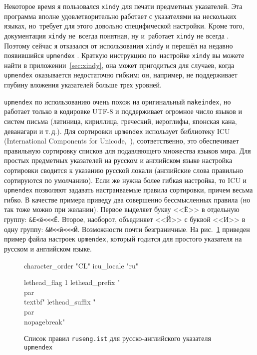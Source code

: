 \documentclass[a4paper,12pt,hyphens]{article}
\newcommand\exe[1]{\texttt{#1}}
\newcommand\file[1]{\texttt{#1}}
\begin{document}
Некоторое время я пользовался \exe{xindy} \parencite{ctan-xindy} для печати предметных указателей. Эта программа
вполне удовлетворительно работает с указателями на нескольких языках, но~требует для этого довольно специфической настройки.
Кроме того, документация \exe{xindy} не~всегда понятная, ну и~работает \exe{xindy} не всегда \parencite{se-xindy}.
Поэтому сейчас я отказался от использования \exe{xindy} и перешёл на недавно появившийся \exe{upmendex} \parencite{ctan-upmendex}. Краткую инструкцию по~настройке \exe{xindy} вы можете найти в приложении~\ref{sec:xindy}, она может пригодиться для случаев, когда \exe{upmendex} оказывается недостаточно гибким: он, например, не поддерживает глубину вложения указателей больше трех уровней.

\exe{upmendex} по использованию очень похож на оригинальный \exe{makeindex}, но работает только в кодировке UTF-8
и поддерживает огромное число языков и систем письма (латиница, кириллица, греческий, иероглифы, японская кана, деванагари и т.\,д.).
Для сортировки \exe{upmendex} использует библиотеку ICU (International Components for Unicode,~\parencite{site-icu}),
соответственно, это обеспечивает правильную сортировку списков для подавляющего множества языков мира. Для простых
предметных указателей на русском и английском языке настройка сортировки сводится к указанию русской локали (английские
слова правильно сортируются по умолчанию). Если же нужна более гибкая настройка, то ICU и \exe{upmendex} позволяют
задавать настраиваемые правила сортировки, причем весьма гибко. В качестве примера приведу два совершенно бессмысленных
правила (но так тоже можно при желании). Первое выделяет букву <<Ё>> в отдельную группу: \texttt{\&Е<ё<<<Ё}. Второе, наоборот,
объединяет <<Й>> с буквой <<И>> в одну группу: \texttt{\&И<<й<<<Й}. Возможности почти безграничные.
На рис.~\ref{upmendex1} приведен пример файла настроек \exe{upmendex}, который годится для простого указателя на русском и английском языке.
\begin{figure}[tp]
\begin{istcode}
character_order "CL"
icu_locale "ru"

lethead_flag 1
lethead_prefix "\n  \\par\\textbf{"
lethead_suffix  "}\\par\\nopagebreak"
\end{istcode}
\caption{Список правил \file{ruseng.ist} для русско-английского указателя
\exe{upmendex}}\label{upmendex1}
\end{figure}
\end{document}
